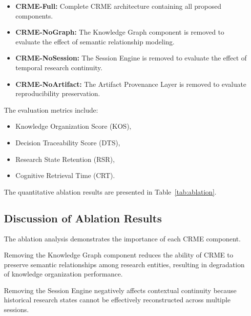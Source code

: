 \begin{itemize}

\item \textbf{CRME-Full:}
Complete CRME architecture containing all proposed components.

\item \textbf{CRME-NoGraph:}
The Knowledge Graph component is removed to evaluate the effect of semantic relationship modeling.

\item \textbf{CRME-NoSession:}
The Session Engine is removed to evaluate the effect of temporal research continuity.

\item \textbf{CRME-NoArtifact:}
The Artifact Provenance Layer is removed to evaluate reproducibility preservation.

\end{itemize}


The evaluation metrics include:

\begin{itemize}

\item Knowledge Organization Score (KOS),
\item Decision Traceability Score (DTS),
\item Research State Retention (RSR),
\item Cognitive Retrieval Time (CRT).

\end{itemize}


The quantitative ablation results are presented in
Table~\ref{tab:ablation}.





\subsection{Discussion of Ablation Results}

The ablation analysis demonstrates the importance of each CRME component.

Removing the Knowledge Graph component reduces the ability of CRME to preserve semantic relationships among research entities, resulting in degradation of knowledge organization performance.

Removing the Session Engine negatively affects contextual continuity because historical research states cannot be effectively reconstructed across multiple sessions.


